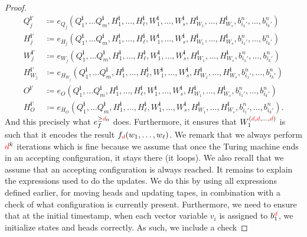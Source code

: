\begin{proof}
	\begin{align*}
		Q_j^{\mathbf{i}'}&\coloneqq e_{Q_j}(Q_1^{\mathbf{i}},\ldots Q_m^{\mathbf{i}},H_1^{\mathbf{i}},\ldots,H_\ell^{\mathbf{i}},W_1^{\mathbf{i}},\ldots,W_s^{\mathbf{i}},H_{W_1}^{\mathbf{i}},\ldots,H_{W_s}^{\mathbf{i}},b_{i_1'}^n,\ldots,b_{i_k'}^n)\\
		H_j^{\mathbf{i}'}&\coloneqq e_{H_j}(Q_1^{\mathbf{i}},\ldots Q_m^{\mathbf{i}},H_1^{\mathbf{i}},\ldots,H_\ell^{\mathbf{i}},W_1^{\mathbf{i}},\ldots,W_s^{\mathbf{i}},H_{W_1}^{\mathbf{i}},\ldots,H_{W_s}^{\mathbf{i}},b_{i_1'}^n,\ldots,b_{i_k'}^n)\\
		W_j^{\mathbf{i}'}&\coloneqq e_{W_j}(Q_1^{\mathbf{i}},\ldots Q_m^{\mathbf{i}},H_1^{\mathbf{i}},\ldots,H_\ell^{\mathbf{i}},W_1^{\mathbf{i}},\ldots,W_s^{\mathbf{i}},H_{W_1}^{\mathbf{i}},\ldots,H_{W_s}^{\mathbf{i}},b_{i_1'}^n,\ldots,b_{i_k'}^n)\\
				H_{W_j}^{\mathbf{i}'}&\coloneqq e_{H_{W_j}}(Q_1^{\mathbf{i}},\ldots Q_m^{\mathbf{i}},H_1^{\mathbf{i}},\ldots,H_\ell^{\mathbf{i}},W_1^{\mathbf{i}},\ldots,W_s^{\mathbf{i}},H_{W_1}^{\mathbf{i}},\ldots,H_{W_s}^{\mathbf{i}},b_{i_1'}^n,\ldots,b_{i_k'}^n)\\
O^{\mathbf{i}'}&\coloneqq e_{O}(Q_1^{\mathbf{i}},\ldots Q_m^{\mathbf{i}},H_1^{\mathbf{i}},\ldots,H_\ell^{\mathbf{i}},W_1^{\mathbf{i}},\ldots,W_s^{\mathbf{i}},H_{W_1}^{\mathbf{i}},\ldots,H_{W_s}^{\mathbf{i}},b_{i_1'}^n,\ldots,b_{i_k'}^n)\\
H_{O}^{\mathbf{i}'}&\coloneqq e_{H_O}(Q_1^{\mathbf{i}},\ldots Q_m^{\mathbf{i}},H_1^{\mathbf{i}},\ldots,H_\ell^{\mathbf{i}},W_1^{\mathbf{i}},\ldots,W_s^{\mathbf{i}},H_{W_1}^{\mathbf{i}},\ldots,H_{W_s}^{\mathbf{i}},b_{i_1'}^n,\ldots,b_{i_k'}^n).
	\end{align*}
And this precisely what $e_f^{\geq {\color{red} d}_0}$ does. Furthermore,	it ensures that  $W_1^{({\color{red} d},{\color{red} d},\ldots,{\color{red} d})}$ is such that it encodes the result $f_{\color{red} d}(w_1,\ldots,w_\ell)$. We remark that we
always perform ${\color{red} d}^k$ iterations which is fine because we assume that once the Turing machine ends in an accepting configuration,
it stays there (it loops). We also recall that we assume that an accepting configuration is always reached. It remains to
explain the expressions used to do the updates. We do this by using all expressions defined earlier, for moving heads and updating
tapes, in combination with a check of what configuration is currently present. Furthermore, we need to ensure that at the initial timestamp,
when each vector variable $v_i$ is assigned to $b_1^{{\color{red} d}}$, we initialize states and heads correctly. As such, we include a check

\end{proof}
